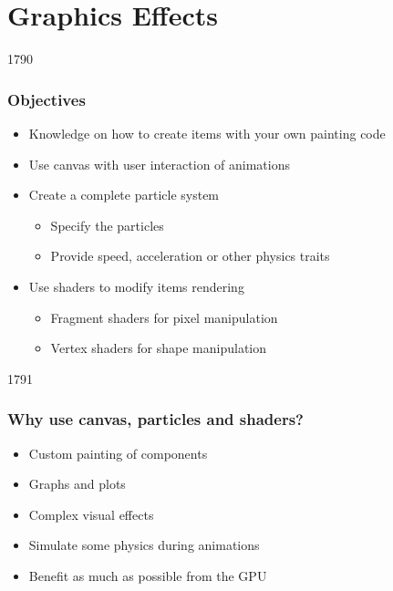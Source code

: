 %
%
%
%

\section{Graphics Effects}

\begin{slide}{1790}\frametitle{Objectives}

\vspace*{1em}
\begin{itemize}
\item Knowledge on how to create items with your own painting code
\item Use canvas with user interaction of animations
\item Create a complete particle system
  \begin{itemize}
  \item Specify the particles
  \item Provide speed, acceleration or other physics traits
  \end{itemize}
\item Use shaders to modify items rendering
  \begin{itemize}
  \item Fragment shaders for pixel manipulation
  \item Vertex shaders for shape manipulation
  \end{itemize}
\end{itemize}

\end{slide}

\begin{slide}{1791}\frametitle{Why use canvas, particles and shaders?}

\begin{itemize}
\item Custom painting of components
\item Graphs and plots
\end{itemize}
\vspace*{0.5em}
\begin{itemize}
\item Complex visual effects
\item Simulate some physics during animations
\item Benefit as much as possible from the GPU
\end{itemize}


\end{slide}





